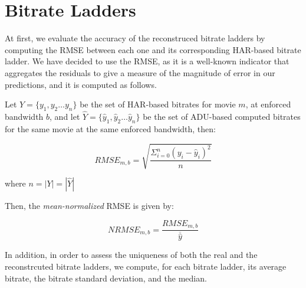 
\section{Bitrate Ladders}

At first, we evaluate the accuracy of the reconstruced bitrate ladders by computing the RMSE between each one and its corresponding HAR-based bitrate ladder. We have decided to use the RMSE, as it is a well-known indicator that aggregates the residuals to give a measure of the magnitude of error in our predictions, and it is computed as follows.

Let $Y=\{y_1, y_2 \dots y_n\}$ be the set of HAR-based bitrates for movie $m$, at enforced bandwidth
$b$, and let $\hat{Y}=\{\hat{y}_1, \hat{y}_2 \dots \hat{y}_n\}$ be the set of ADU-based computed bitrates for the same
movie at the same enforced bandwidth, then:

\begin{equation*}
    RMSE_{m, b} = \sqrt{\dfrac{\Sigma_{i=0}^{n}(y_i - \hat{y}_i)^2}{n}}
\end{equation*}

where $n = |Y| = |\hat{Y}|$

Then, the \emph{mean-normalized} RMSE is given by:

\begin{equation*}
    NRMSE_{m, b} = \dfrac{RMSE_{m, b}}{\overline{\hat{y}}}
\end{equation*}

In addition, in order to assess the uniqueness of both the real and the
reconstrcuted bitrate ladders, we compute, for each bitrate ladder, its average
bitrate, the bitrate standard deviation, and the median.

